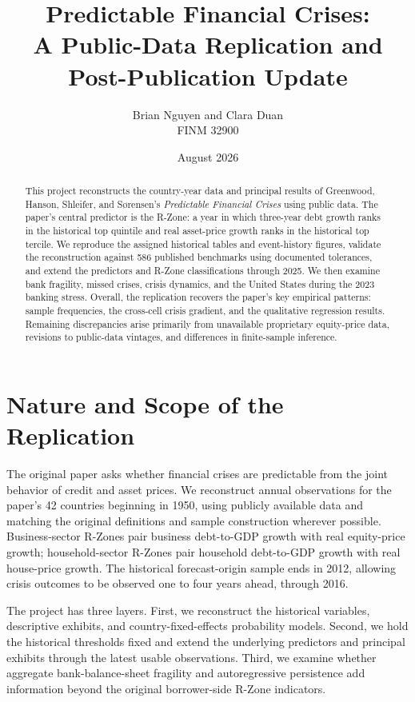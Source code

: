 \documentclass[11pt]{article}
\title{Predictable Financial Crises:\\A Public-Data Replication and Post-Publication Update}
\author{Brian Nguyen and Clara Duan\\[0.5em]\normalsize FINM 32900}
\date{August 2026}
\begin{document}
\maketitle

\begin{abstract}
This project reconstructs the country-year data and principal results of
Greenwood, Hanson, Shleifer, and S{\o}rensen's \textit{Predictable Financial
Crises} using public data. The paper's central predictor is the R-Zone: a
year in which three-year debt growth ranks in the historical top quintile and
real asset-price growth ranks in the historical top tercile. We reproduce the
assigned historical tables and event-history figures, validate the
reconstruction against 586 published benchmarks using documented tolerances,
and extend the predictors and R-Zone classifications through 2025. We then
examine bank fragility, missed crises, crisis dynamics, and the United States
during the 2023 banking stress. Overall, the replication recovers the paper's
key empirical patterns: sample frequencies, the cross-cell crisis gradient,
and the qualitative regression results. Remaining discrepancies arise
primarily from unavailable proprietary equity-price data, revisions to
public-data vintages, and differences in finite-sample inference.
\end{abstract}

\tableofcontents
\clearpage

\section{Nature and Scope of the Replication}

The original paper asks whether financial crises are predictable from the
joint behavior of credit and asset prices. We reconstruct annual observations
for the paper's 42 countries beginning in 1950, using publicly available data
and matching the original definitions and sample construction wherever
possible. Business-sector R-Zones pair business debt-to-GDP growth with real
equity-price growth; household-sector R-Zones pair household debt-to-GDP
growth with real house-price growth. The historical forecast-origin sample
ends in 2012, allowing crisis outcomes to be observed one to four years
ahead, through 2016.

The project has three layers. First, we reconstruct the historical variables,
descriptive exhibits, and country-fixed-effects probability models. Second,
we hold the historical thresholds fixed and extend the underlying predictors
and principal exhibits through the latest usable observations. Third, we
examine whether aggregate bank-balance-sheet fragility and autoregressive
persistence add information beyond the original borrower-side R-Zone
indicators.
\end{document}
